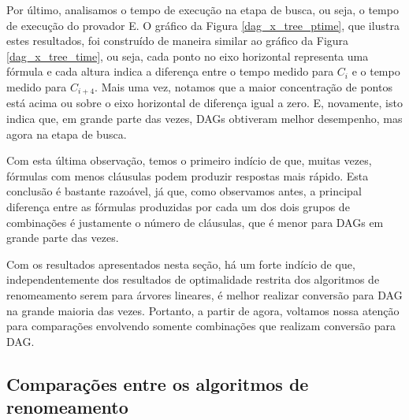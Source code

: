 
Por último, analisamos o tempo de execução na etapa de busca, ou seja, o tempo de execução do provador E. O gráfico da Figura \ref{dag_x_tree_ptime}, que ilustra estes resultados, foi construído de maneira similar ao gráfico da Figura \ref{dag_x_tree_time}, ou seja, cada ponto no eixo horizontal representa uma fórmula e cada altura indica a diferença entre o tempo medido para $C_i$ e o tempo medido para $C_{i+4}$. Mais uma vez, notamos que a maior concentração de pontos está acima ou sobre o eixo horizontal de diferença igual a zero. E, novamente, isto indica que, em grande parte das vezes, DAGs obtiveram melhor desempenho, mas agora na etapa de busca.

Com esta última observação, temos o primeiro indício de que, muitas vezes, fórmulas com menos cláusulas podem produzir respostas mais rápido. Esta conclusão é bastante razoável, já que, como observamos antes, a principal diferença entre as fórmulas produzidas por cada um dos dois grupos de combinações é justamente o número de cláusulas, que é menor para DAGs em grande parte das vezes.

Com os resultados apresentados nesta seção, há um forte indício de que, independentemente dos resultados de optimalidade restrita dos algoritmos de renomeamento serem para árvores lineares, é melhor realizar conversão para DAG na grande maioria das vezes. Portanto, a partir de agora, voltamos nossa atenção para comparações envolvendo somente combinações que realizam conversão para DAG.


\subsection{Comparações entre os algoritmos de renomeamento}

\indent

